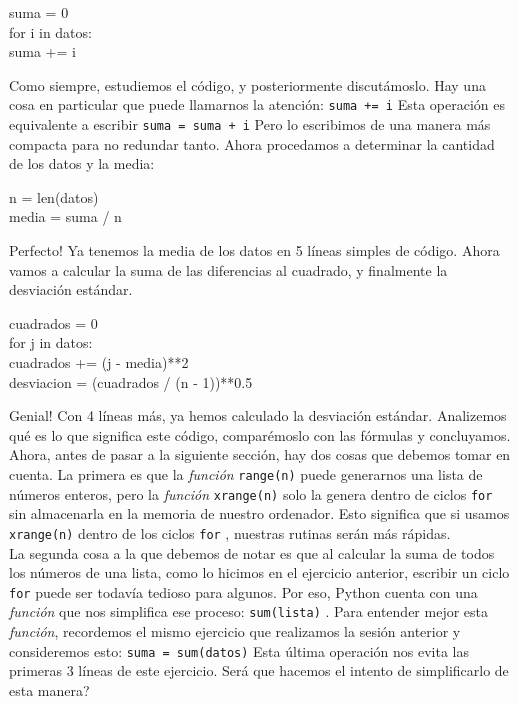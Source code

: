 \documentclass[10pt,letterpaper]{article}
\newcommand{\inlinecode}[1]{
\colorbox{light-gray}{\texttt{#1}}
}
\newenvironment{Code}
{
\begin{lrbox}{\selvestebox}%
\begin{minipage}{\dimexpr\columnwidth-2\fboxsep\relax}
\fontfamily{\ttdefault}\selectfont
}
{\end{minipage}\end{lrbox}%
\begin{center}
\colorbox{light-gray}{\usebox{\selvestebox}}
\end{center}
}
\begin{document}
\begin{Code}
suma = 0\\
for i in datos:\\
\hspace*{4mm} suma += i
\end{Code}

Como siempre, estudiemos el c\'odigo, y posteriormente discut\'amoslo. Hay una cosa en particular que puede llamarnos la atenci\'on: \inlinecode{suma += i} Esta operaci\'on es equivalente a escribir \inlinecode{suma = suma + i} Pero lo escribimos de una manera m\'as compacta para no redundar tanto. Ahora procedamos a determinar la cantidad de los datos y la media:

\begin{Code}
n = len(datos)\\
media = suma / n
\end{Code}

Perfecto! Ya tenemos la media de los datos en 5 l\'ineas simples de c\'odigo. Ahora vamos a calcular la suma de las diferencias al cuadrado, y finalmente la desviaci\'on est\'andar.

\begin{Code}
cuadrados = 0\\
for j in datos:\\
\hspace*{4mm} cuadrados += (j - media)**2\\
desviacion = (cuadrados / (n - 1))**0.5
\end{Code}

Genial! Con 4 l\'ineas m\'as, ya hemos calculado la desviaci\'on est\'andar. Analizemos qu\'e es lo que significa este c\'odigo, compar\'emoslo con las f\'ormulas y concluyamos.\\

Ahora, antes de pasar a la siguiente secci\'on, hay dos cosas que debemos tomar en cuenta. La primera es que la \emph{funci\'on} \inlinecode{range(n)} puede generarnos una lista de n\'umeros enteros, pero la \emph{funci\'on} \inlinecode{xrange(n)} solo la genera dentro de ciclos \inlinecode{for} sin almacenarla en la memoria de nuestro ordenador. Esto significa que si usamos \inlinecode{xrange(n)} dentro de los ciclos \inlinecode{for}, nuestras rutinas ser\'an m\'as r\'apidas.\\

La segunda cosa a la que debemos de notar es que al calcular la suma de todos los n\'umeros de una lista, como lo hicimos en el ejercicio anterior, escribir un ciclo \inlinecode{for} puede ser todav\'ia tedioso para algunos. Por eso, Python cuenta con una \emph{funci\'on} que nos simplifica ese proceso: \inlinecode{sum(lista)}. Para entender mejor esta \emph{funci\'on}, recordemos el mismo ejercicio que realizamos la sesi\'on anterior y consideremos esto: \inlinecode{suma = sum(datos)} Esta \'ultima operaci\'on nos evita las primeras 3 l\'ineas de este ejercicio. Ser\'a que hacemos el intento de simplificarlo de esta manera?
\end{document}

